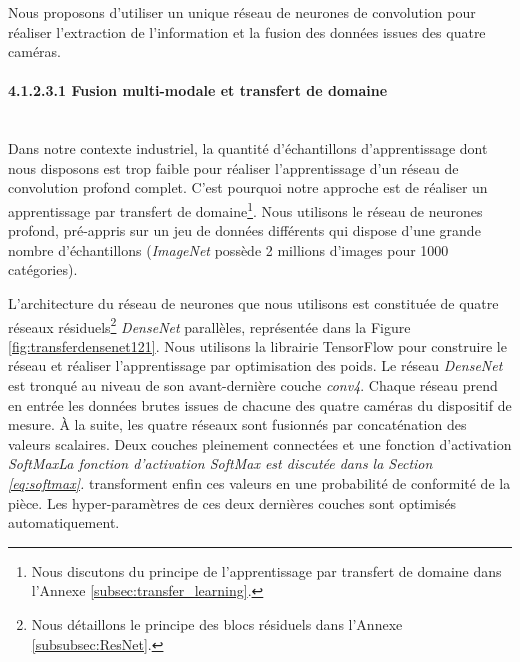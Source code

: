 Nous proposons d'utiliser un unique réseau de neurones de convolution pour réaliser l'extraction de l'information et la fusion des données issues des quatre caméras.

\paragraph{4.1.2.3.1 Fusion multi-modale et transfert de domaine} \mbox{} \\
Dans notre contexte industriel, la quantité d'échantillons d'apprentissage dont nous disposons est trop faible pour réaliser l'apprentissage d'un réseau de convolution profond complet.
C'est pourquoi notre approche est de réaliser un apprentissage par transfert de domaine\footnote{Nous discutons du principe de l'apprentissage par transfert de domaine dans l'Annexe \ref{subsec:transfer_learning}.}.
Nous utilisons le réseau de neurones profond, pré-appris sur un jeu de données différents qui dispose d'une grande nombre d'échantillons (\textit{ImageNet} possède 2 millions d'images pour 1000 catégories).

L'architecture du réseau de neurones que nous utilisons est constituée de quatre réseaux résiduels\footnote{Nous détaillons le principe des blocs résiduels dans l'Annexe \ref{subsubsec:ResNet}.} \textit{DenseNet} parallèles, représentée dans la Figure \ref{fig:transferdensenet121}.
Nous utilisons la librairie TensorFlow \cite{abadi_tensorflow_2016} pour construire le réseau et réaliser l'apprentissage par optimisation des poids.
Le réseau \textit{DenseNet} est tronqué au niveau de son avant-dernière couche \textit{conv4}.
Chaque réseau prend en entrée les données brutes issues de chacune des quatre caméras du dispositif de mesure.
À la suite, les quatre réseaux sont fusionnés par concaténation des valeurs scalaires.
Deux couches pleinement connectées et une fonction d'activation \textit{SoftMax}\textit{La fonction d'activation \textit{SoftMax} est discutée dans la Section \ref{eq:softmax}.} transforment enfin ces valeurs en une probabilité de conformité de la pièce.
Les hyper-paramètres de ces deux dernières couches sont optimisés automatiquement.


